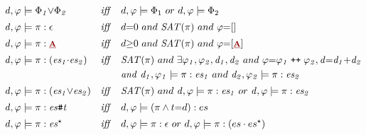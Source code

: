 \documentclass[acmsmall,review,anonymous]{acmart}\settopmatter{printfolios=true,printccs=false,printacmref=false}
\newcommand{\mysharp}{{\mathrel{\texttt{\#}}}}
\newcommand{\lappend}{\mathrel{\texttt{++}}}
\newcommand{\effect}{\textcolor{black}{\ensuremath{\mathrm{\Phi}}}}
\newcommand{\anyevent}[1]{{\textcolor{darkred}
{\underline{\textbf{\footnotesize #1}}}}}
\newcommand{\code}[1]{{\tt{\ensuremath{\m{#1}}}}}
\newcommand{\esn}[2]{\ensuremath{#1^{#2}}}
\newcommand{\m}{\mathit}
\begin{document}
{\begin{figure}[!ht]
  \renewcommand{\arraystretch}{1.2}
\begin{align*} 
&\code{d, \varphi \models \effect_1 {\vee} \effect_2}  
&\m{iff}\quad 
&  d, \varphi \models \effect_1 \ or \ d, \varphi \models \effect_2
\\[0.2em]
&\code{d, \varphi \models \pi : \epsilon }  
&\m{iff}\quad 
&  d{=}0 \ and\  {\m{SAT}(\pi)}  \ and \ \varphi {=} [] 
\\[0.2em]
&\code{d, \varphi \models  \pi : \anyevent{A} }  &\m{iff}\quad 
& d {\geq} 0 \ and\ {\m{SAT}(\pi)}  \ and \ 
\varphi {=} \code{[\anyevent{A}]}
\\[0.2em]
&\code{d, \varphi \models  \pi : (es_1{\cdot}es_2)}  
&\m{iff}\quad 
& {\m{SAT}(\pi)}  \ and \ \exists \code{\varphi_1, \varphi_2, d_1, d_2}\ and\ \code{
\varphi {=} \varphi_1 \lappend \varphi_2, d {=} d_1 {+} d_2 
}\\
& & &
\m{and}\ \code{d_1, \varphi_1 \models  \pi : es_1}  \ and \ 
\code{d_2, \varphi_2 \models  \pi : es_2}  
\\[0.2em]
&\code{d, \varphi \models  \pi : (es_1 {\vee} es_2)}  
&\m{iff}\quad 
& {\m{SAT}(\pi)}  \ and \ \code{d, \varphi \models  \pi :  es_1 } \ or \ 
\code{d, \varphi \models  \pi :  es_2}  
\\[0.2em]
&\code{d, \varphi \models  \pi : es \mysharp  t }  
&\m{iff}\quad 
& d, \varphi \models  (\pi \wedge t{=}d) : es
\\[0.2em]
&\code{d,  \varphi \models \pi : \esn{es}{\star}  }  
&\m{iff}\quad 
&d, \varphi \models \pi :  \epsilon \ or \ 
d, \varphi \models \pi :  (es \cdot \esn{es}{\star} ) 
\\[0.2em]

\end{align*}
\end{figure}}
\end{document}
